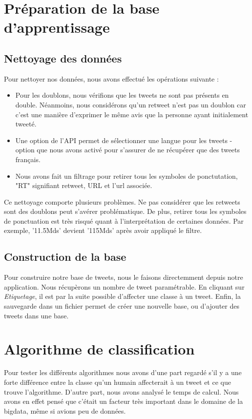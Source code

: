 \documentclass[a4paper,10pt]{report}
\begin{document}
  \section{Préparation de la base d'apprentissage}
    \subsection{Nettoyage des données}
      Pour nettoyer nos données, nous avons effectué les opérations suivante : 
      \begin{itemize}
       \item Pour les doublons, nous vérifions que les tweets ne sont pas présents en double. Néanmoins, nous considérons qu'un retweet n'est pas un doublon car c'est une manière d'exprimer le même avis que la personne ayant initialement tweeté.
       \item Une option de l'API permet de sélectionner une langue pour les tweets - option que nous avons activé pour s'assurer de ne récupérer que des tweets français.
       \item Nous avons fait un filtrage pour retirer tous les symboles de ponctutation, "RT" signifiant retweet, URL et l'url associée.
      \end{itemize}
      Ce nettoyage comporte plusieurs problèmes. Ne pas considérer que les retweets sont des doublons peut s'avérer problématique. De plus, retirer tous les symboles de ponctuation est très risqué quant à l'interprétation de certaines données. Par exemple, '11.5Mds' devient '115Mds' après avoir appliqué le filtre.
      

    \subsection{Construction de la base}
      Pour construire notre base de tweets, nous le faisons directemment depuis notre application. Nous récupèrons un nombre de tweet paramétrable. En cliquant sur \emph{Etiquetage}, il est par la suite possible d'affecter une classe à un tweet. Enfin, la sauvegarde dans un fichier permet de créer une nouvelle base, ou d'ajouter des tweets dans une base.

  \section{Algorithme de classification}
    Pour tester les différents algorithmes nous avons d'une part regardé s'il y a une forte différence entre la classe qu'un humain affecterait à un tweet et ce que trouve l'algorithme. D'autre part, nous avons analysé le temps de calcul. Nous avons en effet pensé que c'était un facteur très important dans le domaine de la bigdata, même si avions peu de données.
     
\end{document}
